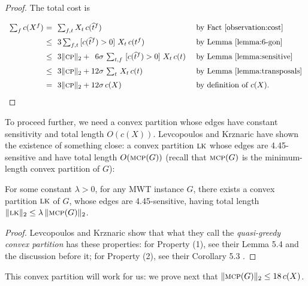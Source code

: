 \documentclass[final]{siamltex}
\newcommand{\transposal}[2]{{#1}^{#2}}
\newcommand{\triangulated}[2]{{\widehat{#1}}^{#2}}
\newcommand{\LK}{\text{\sc lk}}
\newcommand{\MCP}{\text{\sc mcp}}
\newcommand{\cost}{c}
\newcommand{\face}{f}
\newcommand{\graph}{G}
\newcommand{\tri}{t}  \newcommand{\vertex}{v}
\newcommand{\fracTriang}{X}
\newcommand{\sensitivity}{\sigma}
\begin{document}
\begin{proof}
The total cost is
\[
\setlength{\extrarowheight}{6pt}
\begin{array}{r@{~}c@{~~}l@{~~~~}l}
\textstyle \sum_\face \cost(\transposal{\fracTriang}{\face}) 
&=& \textstyle\sum_{\face,\tri} \fracTriang_\tri\, \cost(\triangulated{\tri}{\face})
& \text{by Fact~\ref{observation:cost}}
\\
&\le& 3\sum_{\face,\tri} \,
[\cost(\triangulated{\tri}{\face})>0]~
\fracTriang_\tri \,
\cost(\transposal{\tri}{\face})
& \text{by Lemma~\ref{lemma:6-gon}}
\\
&\le& 3\|\convPart\|_2 + ~\,6\sensitivity\, \sum_{\tri,\face} ~
[\cost(\triangulated{\tri}{\face})>0]~
\fracTriang_\tri \,\cost(\tri)
& \text{by Lemma~\ref{lemma:sensitive}}
\\
&\le& 3\|\convPart\|_2 + 12 \sensitivity \,\sum_{\tri}\, \fracTriang_\tri\, \cost(\tri)
& \text{by Lemma~\ref{lemma:transposals}}
\\ 
&=&3\|\convPart\|_2 + 12 \sensitivity\, \cost(\fracTriang)
& \text{by definition of $\cost(\fracTriang)$.}
\end{array}
\]
\end{proof}

To proceed further,
we need a convex partition whose edges have constant sensitivity
and total length $O(\cost(\fracTriang))$.
Levcopoulos and Krznaric have shown the existence 
of something close: a convex partition $\LK$ whose edges are 4.45-sensitive
and have total length $O(\MCP(\graph))$
(recall that $\MCP(\graph)$ is the minimum-length convex partition of $\graph$):

\begin{lemma}\label{lemma:LK}
  For some constant $\lambda>0$, for any MWT instance $\graph$,
  there exists a convex partition $\LK$ of $\graph$,
  whose edges are 4.45-sensitive,
  having total length $\|\LK\|_2 \le \lambda\,\|\MCP(\graph)\|_2$.
\end{lemma}

\begin{proof}
  Levcopoulos and Krznaric 
  show that what they call the {\em quasi-greedy convex partition}
  has these properties:
  for Property (1), see their Lemma 5.4 and the discussion before it;
  for Property (2), see their Corollary 5.3   \cite{krznaric1998quasi}.
\end{proof}

This convex partition will work for us:
we prove next that $\|\MCP(\graph)\|_2 \le 18\,\cost(\fracTriang)$.
\end{document}
